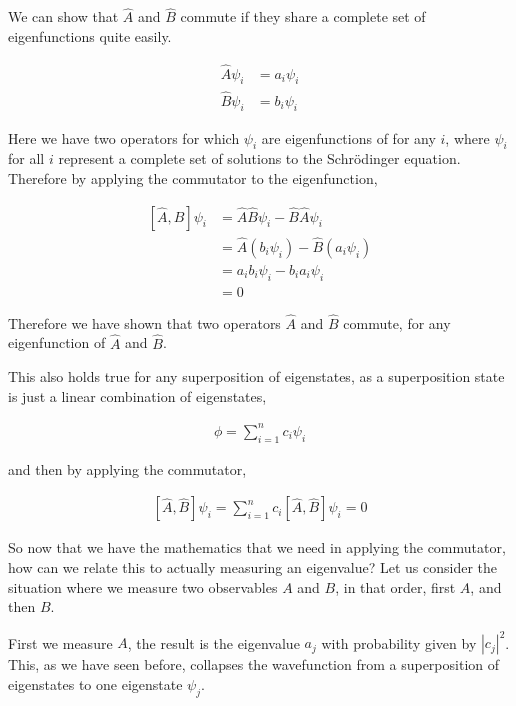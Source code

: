\documentclass[11pt]{amsart}
\begin{document}
We can show that $\hat{A}$ and $\hat{B}$ commute if they share a complete set of eigenfunctions quite easily.

\begin{align*}
  \hat{A}\psi_i&=a_i\psi_i \\
  \hat{B}\psi_i&=b_i\psi_i
\end{align*}

Here we have two operators for which $\psi_i$ are eigenfunctions of for any $i$, where $\psi_i$ for all $i$ represent a complete set of solutions to the Schr\"{o}dinger equation. Therefore by applying the commutator to the eigenfunction,

\begin{align*}
  \left[\hat{A}, \hat{B}\right]\psi_i &= \hat{A}\hat{B}\psi_i - \hat{B}\hat{A}\psi_i \\
                                      &= \hat{A}(b_i \psi_i) - \hat{B}(a_i \psi_i) \\
                                      &= a_ib_i\psi_i - b_ia_i\psi_i \\
                                      &= 0
\end{align*}

Therefore we have shown that two operators $\hat{A}$ and $\hat{B}$ commute, for any eigenfunction of $\hat{A}$ and $\hat{B}$.

This also holds true for any superposition of eigenstates, as a superposition state is just a linear combination of eigenstates,

\begin{align*}
  \phi = \sum\limits_{i=1}^n c_i \psi_i
\end{align*}

and then by applying the commutator,

\begin{align*}
  \left[\hat{A}, \hat{B}\right]\psi_i = \sum\limits_{i=1}^n c_i \left[\hat{A}, \hat{B}\right]\psi_i = 0
\end{align*}

So now that we have the mathematics that we need in applying the commutator, how can we relate this to actually measuring an eigenvalue? Let us consider the situation where we measure two observables $A$ and $B$, in that order, first $A$, and then $B$.

First we measure $A$, the result is the eigenvalue $a_j$ with probability given by ${|c_j|}^2$. This, as we have seen before, collapses the wavefunction from a superposition of eigenstates to one eigenstate $\psi_j$.
\end{document}
